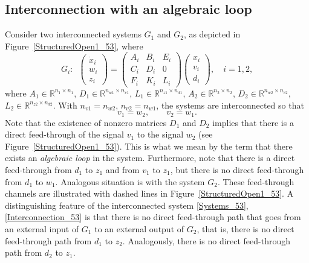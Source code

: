 \documentclass[11pt,a4paper,oneside,DIV=12,headings=small]{scrartcl}
\newcommand{\Rset}{\mathbb{R}}
\theoremstyle{plain}
\begin{document}
\subsection{Interconnection with an algebraic loop}
\label{Sec3_A}

Consider two interconnected systems $G_1$ and $G_2$, as depicted in Figure~\ref{StructuredOpen1_53}, where
\begin{equation}
\label{Systems_53}
G_i: \,\,\,
\begin{pmatrix} \dot{x}_i \\ w_i \\ z_i \end{pmatrix}=
\begin{pmatrix} A_i & B_i & E_i \\
C_i & D_i & 0 \\
F_i & K_i & L_i \end{pmatrix}
\begin{pmatrix} x_i \\ v_i \\ d_i \end{pmatrix}, 
\quad i=1,2,
\end{equation}
where $A_1 \in \Rset^{n_1 \times n_1}$, $D_1\in \Rset^{n_{w1}\times n_{v1}}$, $L_1 \in \Rset^{n_{z1}\times n_{d1}}$, $A_2 \in \Rset^{n_2 \times n_2}$, $D_2\in \Rset^{n_{w2}\times n_{v2}}$, $L_2 \in \Rset^{n_{z2}\times n_{d2}}$. 
With $n_{v1}=n_{w2}$, $n_{v2}=n_{w1}$, the systems are interconnected so that
\begin{equation}
\label{Interconnection_53}
v_1=w_2, \quad \quad v_2=w_1.
\end{equation}
Note that the existence of nonzero matrices $D_1$ and $D_2$ implies that there is a direct feed-through of the signal $v_1$ to the signal $w_2$ (see Figure~\ref{StructuredOpen1_53}). This is what we mean by the term that there exists an \emph{algebraic loop} in the system.
Furthermore, note that there is a direct feed-through from $d_1$ to $z_1$ and from $v_1$ to $z_1$, but there is no direct feed-through from $d_1$ to $w_1$. Analogous situation is with the system $G_2$. These feed-through channels are illustrated with dashed lines in Figure~\ref{StructuredOpen1_53}. A distinguishing feature of the interconnected system \eqref{Systems_53}, \eqref{Interconnection_53} is that there is no direct feed-through path that goes from an external input of $G_1$ to an external output of $G_2$, that is, there is no direct feed-through path from $d_1$ to $z_2$. Analogously, there is no direct feed-through path from $d_2$ to $z_1$.  
\end{document}
